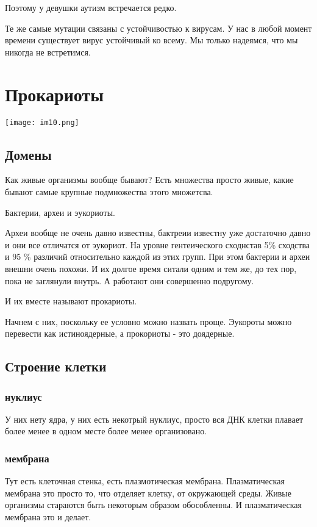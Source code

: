 Поэтому у девушки аутизм встречается редко. 

Те же самые мутации связаны с устойчивостью к вирусам. У нас в любой момент 
времени существует вирус устойчивый ко всему. Мы только надеямся, что мы никогда не встретимся. 

\section{Прокариоты} 
\texttt{[image: im10.png]}
\subsection{Домены}
Как живые организмы вообще бывают? 
Есть множества просто живые, какие бывают самые крупные подмножества 
этого множетсва. 

Бактерии, археи и эукориоты. 

Археи вообще не очень давно известны, бактреии известну уже 
достаточно давно и они все отличатся от эукориот. На уровне 
гентеического сходнстав 5\% сходства и 95 \% различий относительно каждой из этих 
групп. При этом бактерии и археи внешни очень похожи. И их 
долгое время ситали одним и тем же, до тех пор, 
пока не заглянули внутрь. А работают они совершенно подругому. 

И их вместе называют прокариоты. 

Начнем с них, поскольку ее условно можно назвать проще. Эукороты 
можно перевести как истиноядерные, а прокориоты - это доядерные. 

\subsection{Строение клетки}

\subsubsection{нуклиус}
У них нету ядра, у них есть некотрый нуклиус, просто вся ДНК
клетки плавает более менее в одном месте более менее организовано.

\subsubsection{мембрана}
Тут есть клеточная стенка, есть плазмотическая мембрана. Плазматическая мембрана
это просто то, что отделяет клетку, от окружающей среды. Живые организмы стараются
быть некоторым образом обособленны. И плазматическая мембрана это и делает.
                                                      
